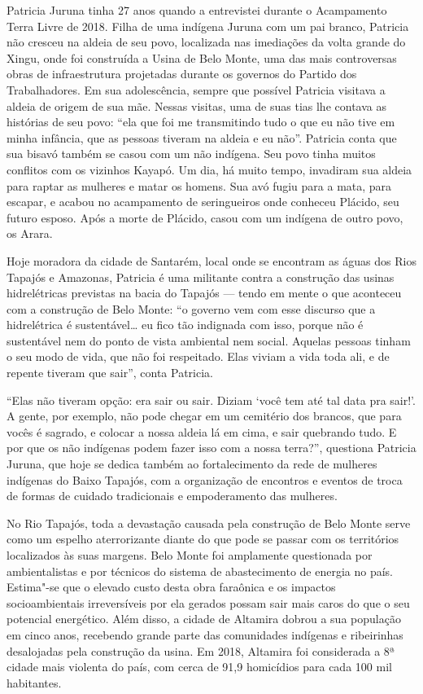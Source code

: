 Patricia Juruna tinha 27 anos quando a entrevistei durante o Acampamento
Terra Livre de 2018. Filha de uma indígena Juruna com um pai branco,
Patricia não cresceu na aldeia de seu povo, localizada nas imediações da
volta grande do Xingu, onde foi construída a Usina de Belo Monte, uma
das mais controversas obras de infraestrutura projetadas durante os
governos do Partido dos Trabalhadores. Em sua adolescência, sempre que
possível Patricia visitava a aldeia de origem de sua mãe. Nessas
visitas, uma de suas tias lhe contava as histórias de seu povo: ``ela
que foi me transmitindo tudo o que eu não tive em minha infância, que as
pessoas tiveram na aldeia e eu não''. Patricia conta que sua bisavó
também se casou com um não indígena. Seu povo tinha muitos conflitos com
os vizinhos Kayapó. Um dia, há muito tempo, invadiram sua
aldeia para raptar as mulheres e matar os homens. Sua avó fugiu para a
mata, para escapar, e acabou no acampamento de seringueiros onde
conheceu Plácido, seu futuro esposo. Após a morte de Plácido, casou com
um indígena de outro povo, os Arara.

Hoje moradora da cidade de Santarém, local onde se encontram as águas
dos Rios Tapajós e Amazonas, Patricia é uma militante contra a
construção das usinas hidrelétricas previstas na bacia do Tapajós --- tendo
em mente o que aconteceu com a construção de Belo
Monte: ``o governo vem com esse discurso que a hidrelétrica é
sustentável\ldots{} eu fico tão indignada com isso, porque não é
sustentável nem do ponto de vista ambiental nem social. Aquelas pessoas
tinham o seu modo de vida, que não foi respeitado. Elas viviam a vida
toda ali, e de repente tiveram que sair'', conta Patricia.

``Elas não tiveram opção: era sair ou sair. Diziam `você tem até tal
data pra sair!'. A gente, por exemplo, não pode chegar em um cemitério
dos brancos, que para vocês é sagrado, e colocar a nossa aldeia lá em
cima, e sair quebrando tudo. E por que os não indígenas podem fazer isso
com a nossa terra?'', questiona Patricia Juruna, que hoje se dedica também ao
fortalecimento da rede de mulheres indígenas do Baixo Tapajós, com a
organização de encontros e eventos de troca de formas de cuidado
tradicionais e empoderamento das mulheres.

No Rio Tapajós, toda a devastação causada pela construção de Belo Monte
serve como um espelho aterrorizante diante do que pode se passar com os
territórios localizados às suas margens. Belo Monte foi amplamente
questionada por ambientalistas e por técnicos do sistema de
abastecimento de energia no país. Estima"-se que o elevado custo desta obra
faraônica e os impactos socioambientais irreversíveis por ela gerados
possam sair mais caros do que o seu potencial energético. Além disso, a
cidade de Altamira dobrou a sua população em cinco anos, recebendo
grande parte das comunidades indígenas e ribeirinhas desalojadas pela
construção da usina. Em 2018, Altamira foi considerada a 8ª cidade mais
violenta do país, com cerca de 91,9 homicídios para cada 100 mil
habitantes.

